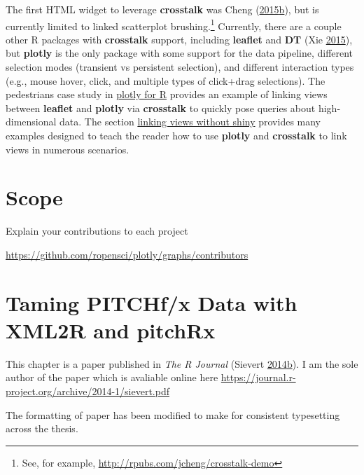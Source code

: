 \documentclass[12pt,]{isuthesis}
\let\rmarkdownfootnote\footnote%
\def\footnote{\protect\rmarkdownfootnote}
\begin{document}
The first HTML widget to leverage \textbf{crosstalk} was Cheng
(\protect\hyperlink{ref-d3scatter}{2015}\protect\hyperlink{ref-d3scatter}{b}),
but is currently limited to linked scatterplot brushing.\footnote{See,
  for example, \url{http://rpubs.com/jcheng/crosstalk-demo}} Currently,
there are a couple other R packages with \textbf{crosstalk} support,
including \textbf{leaflet} and \textbf{DT} (Xie
\protect\hyperlink{ref-DT}{2015}), but \textbf{plotly} is the only
package with some support for the data pipeline, different selection
modes (transient vs persistent selection), and different interaction
types (e.g., mouse hover, click, and multiple types of click+drag
selections). The pedestrians case study in
\protect\hyperlink{plotly-for-R}{plotly for R} provides an example of
linking views between \textbf{leaflet} and \textbf{plotly} via
\textbf{crosstalk} to quickly pose queries about high-dimensional data.
The section \protect\hyperlink{linking-views-without-shiny}{linking
views without shiny} provides many examples designed to teach the reader
how to use \textbf{plotly} and \textbf{crosstalk} to link views in
numerous scenarios.

\chapter{Scope}

Explain your contributions to each project

\url{https://github.com/ropensci/plotly/graphs/contributors}

\chapter{Taming PITCHf/x Data with XML2R and pitchRx}

This chapter is a paper published in \emph{The R Journal} (Sievert
\protect\hyperlink{ref-Sievert:2014a}{2014}\protect\hyperlink{ref-Sievert:2014a}{b}).
I am the sole author of the paper which is avaliable online here
\url{https://journal.r-project.org/archive/2014-1/sievert.pdf}

The formatting of paper has been modified to make for consistent
typesetting across the thesis.

\end{document}
